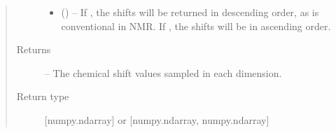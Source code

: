 \documentclass[letterpaper,10pt,english]{sphinxmanual}
\begin{document}
\begin{fulllineitems}
\begin{quote}
\begin{description}
\begin{itemize}
\item {} 
\sphinxAtStartPar
{} (\sphinxstyleliteralemphasis{\sphinxupquote{, }}) – If , the shifts will be returned in descending order, as is
conventional in NMR. If , the shifts will be in ascending order.

\end{itemize}

\item[{Returns}] \leavevmode
\sphinxAtStartPar
{} – The chemical shift values sampled in each dimension.

\item[{Return type}] \leavevmode
\sphinxAtStartPar
{[}numpy.ndarray{]} or {[}numpy.ndarray, numpy.ndarray{]}

\end{description}\end{quote}

\end{fulllineitems}

\end{document}
